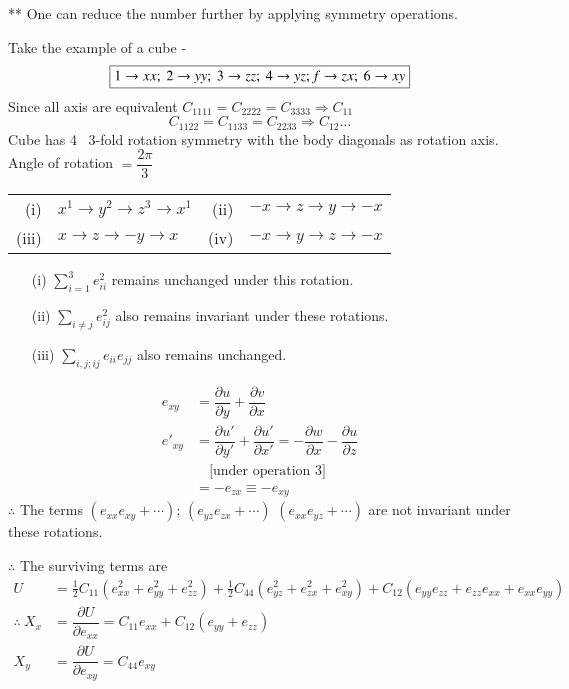 ** One can reduce the number further by applying symmetry operations.

\begin{example*}
Take the example of a cube - 
$$
\fbox{$1\to xx; \ 2\to yy; \ 3\to zz; \ 4\to yz; f\to zx; \ 6\to xy$}
$$
Since all axis are equivalent $C_{1111}=C_{2222}=C_{3333}\Rightarrow C_{11}$
$$
C_{1122}=C_{1133}=C_{2233}\Rightarrow C_{12}\ldots
$$
Cube has 4 \ 3-fold rotation symmetry with the body diagonals as rotation axis. Angle of rotation $=\dfrac{2\pi}{3}$
\begin{center}
\begin{tabular}{rl@{\qquad}rl}
(i) & $x^{1}\to y^{2}\to z^{3}\to x^{1}$ & (ii) & $-x\to z\to y\to -x$\\[3pt]
(iii) & $x\to z\to -y\to x$ & (iv) & $-x\to y\to z\to -x$
\end{tabular}
\end{center}
\begin{itemize}
\item[(i)] $\sum\limits^{3}_{i=1}e^{2}_{ii}$ remains unchanged under this rotation.

\item[(ii)] $\sum\limits_{i\neq j}e^{2}_{ij}$ also remains invariant under these rotations.

\item[(iii)] $\sum\limits_{i,j; ij}e_{ii}e_{jj}$ also remains unchanged.
\end{itemize}
\begin{align*}
e_{xy} &=\dfrac{\partial u}{\partial y}+\dfrac{\partial v}{\partial x}\\
e'_{xy} &=\dfrac{\partial u'}{\partial y'}+\dfrac{\partial u'}{\partial x'}=-\dfrac{\partial w}{\partial x}-\dfrac{\partial u}{\partial z}\\
&\quad \text{[under operation 3]}\\
&= -e_{zx}\equiv -e_{xy}
\end{align*}
$\therefore$ The terms $(e_{xx}e_{xy}+\cdots)$; $(e_{yz}e_{zx}+\cdots)$ $(e_{xx}e_{yz}+\cdots)$ are not invariant under these rotations.

$\therefore$ The surviving terms are
\begin{align*}
U &= \frac{1}{2}C_{11}(e^{2}_{xx}+e^{2}_{yy}+e^{2}_{zz})+\frac{1}{2}C_{44}(e^{2}_{yz}+e^{2}_{zx}+e^{2}_{xy})+C_{12}(e_{yy}e_{zz}+e_{zz}e_{xx}+e_{xx}e_{yy})\\
\therefore \ X_{x} &= \dfrac{\partial U}{\partial e_{xx}}=C_{11}e_{xx}+C_{12}(e_{yy}+e_{zz})\\
X_{y} &= \dfrac{\partial U}{\partial e_{xy}}=C_{44}e_{xy}
\end{align*}


\end{example*}
